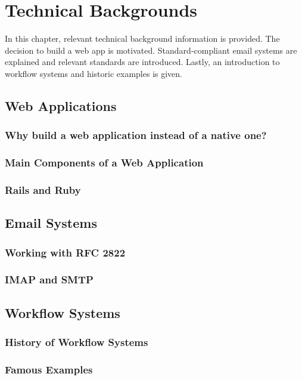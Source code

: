 \chapter{Technical Backgrounds}
\label{chapter:Technical}

In this chapter, relevant technical background information is provided. The decision to build a web app is motivated. Standard-compliant email systems are explained and relevant standards are introduced. Lastly, an introduction to workflow systems and historic examples is given.


\section{Web Applications}

\subsection{Why build a web application instead of a native one?}

\subsection{Main Components of a Web Application}

\subsection{Rails and Ruby}


\section{Email Systems}

\subsection{Working with RFC 2822}

\subsection{IMAP and SMTP}


\section{Workflow Systems}

\subsection{History of Workflow Systems}

\subsection{Famous Examples}
